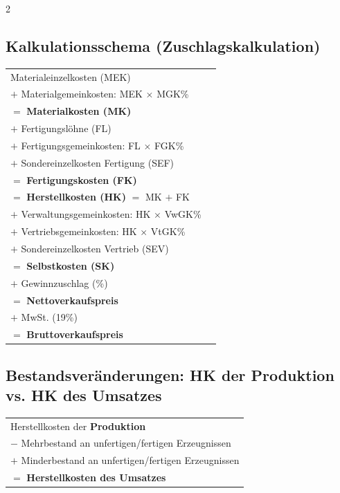 \documentclass[10pt,a4paper]{article}
\begin{document}
\begin{multicols}{2}

\subsection{Kalkulationsschema (Zuschlagskalkulation)}

\begin{formelbox}
\renewcommand{\arraystretch}{1.15}
\begin{tabular}{@{}lr@{}}
Materialeinzelkosten (MEK) & \\
$+$ Materialgemeinkosten: MEK $\times$ MGK\% & \\
\hline
$=$ \textbf{Materialkosten (MK)} & \\[2pt]
$+$ Fertigungslöhne (FL) & \\
$+$ Fertigungsgemeinkosten: FL $\times$ FGK\% & \\
$+$ Sondereinzelkosten Fertigung (SEF) & \\
\hline
$=$ \textbf{Fertigungskosten (FK)} & \\[2pt]
\hline
$=$ \textbf{Herstellkosten (HK)} $=$ MK $+$ FK & \\[2pt]
$+$ Verwaltungsgemeinkosten: HK $\times$ VwGK\% & \\
$+$ Vertriebsgemeinkosten: HK $\times$ VtGK\% & \\
$+$ Sondereinzelkosten Vertrieb (SEV) & \\
\hline
$=$ \textbf{Selbstkosten (SK)} & \\[2pt]
$+$ Gewinnzuschlag (\%) & \\
\hline
$=$ \textbf{Nettoverkaufspreis} & \\
$+$ MwSt. (19\%) & \\
\hline
$=$ \textbf{Bruttoverkaufspreis} & \\
\end{tabular}
\end{formelbox}

\subsection{Bestandsveränderungen: HK der Produktion vs. HK des Umsatzes}

\begin{formelbox}
\renewcommand{\arraystretch}{1.1}
\begin{tabular}{@{}l@{}}
Herstellkosten der \textbf{Produktion} \\
$-$ Mehrbestand an unfertigen/fertigen Erzeugnissen \\
$+$ Minderbestand an unfertigen/fertigen Erzeugnissen \\
\hline
$=$ \textbf{Herstellkosten des Umsatzes} \\
\end{tabular}
\end{formelbox}


\end{multicols}
\end{document}
